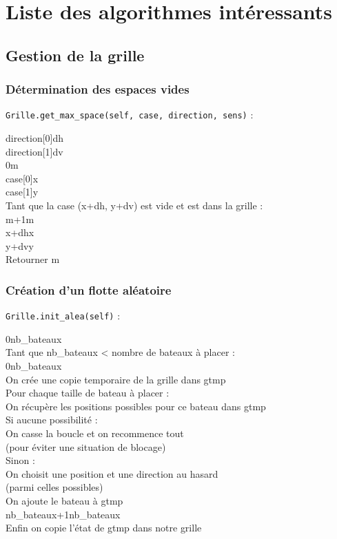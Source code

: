 \chapter{Liste des algorithmes intéressants}

\section{Gestion de la grille}

\subsection{Détermination des espaces vides}\label{get_max_space}
\texttt{Grille.get\_max\_space(self, case, direction, sens)} :
\begin{algo1}
direction[0]\sto dh\\
direction[1]\sto dv\\
0\sto m\\
case[0]\sto x\\
case[1]\sto y\\
Tant que la case (x+dh, y+dv) est vide et est dans la grille :\\
 m+1\sto m\\
 x+dh\sto x\\
 y+dv\sto y\\
Retourner m\\
\end{algo1}

\subsection{Création d'un flotte aléatoire}\label{init_alea}
\texttt{Grille.init\_alea(self)} :
\begin{algo1}
0\sto nb\_bateaux\\
Tant que nb\_bateaux < nombre de bateaux à placer :\\
 0\sto nb\_bateaux\\
 On crée une copie temporaire de la grille dans gtmp\\
 Pour chaque taille de bateau à placer :\\
 On récupère les positions possibles pour ce bateau dans gtmp\\
 Si aucune possibilité :\\
 On casse la boucle et on recommence tout\\
 (pour éviter une situation de blocage)\\
 Sinon :\\
 On choisit une position et une direction au hasard\\
 (parmi celles possibles)\\
 On ajoute le bateau à gtmp\\
 nb\_bateaux+1\sto nb\_bateaux\\
Enfin on copie l'état de gtmp dans notre grille \\
\end{algo1}

